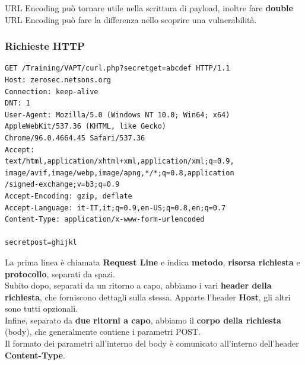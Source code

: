 \documentclass{article}
\begin{document}
URL Encoding può tornare utile nella scrittura di payload, inoltre fare \textbf{double} URL Encoding può fare la differenza nello scoprire una vulnerabilità.

\newpage
\subsubsection{Richieste HTTP}
\begin{minipage}{0.61\textwidth}
\begin{verbatim}
GET /Training/VAPT/curl.php?secretget=abcdef HTTP/1.1
Host: zerosec.netsons.org
Connection: keep-alive
DNT: 1
User-Agent: Mozilla/5.0 (Windows NT 10.0; Win64; x64) 
AppleWebKit/537.36 (KHTML, like Gecko) 
Chrome/96.0.4664.45 Safari/537.36
Accept: 
text/html,application/xhtml+xml,application/xml;q=0.9,
image/avif,image/webp,image/apng,*/*;q=0.8,application
/signed-exchange;v=b3;q=0.9
Accept-Encoding: gzip, deflate
Accept-Language: it-IT,it;q=0.9,en-US;q=0.8,en;q=0.7
Content-Type: application/x-www-form-urlencoded

secretpost=ghijkl
\end{verbatim}
\end{minipage}
\quad
\begin{minipage}{0.35\textwidth}
La prima linea è chiamata \textbf{Request Line} e indica \textbf{metodo}, \textbf{risorsa richiesta} e \textbf{protocollo}, separati da spazi.\\
Subito dopo, separati da un ritorno a capo, abbiamo i vari \textbf{header della richiesta}, che forniscono dettagli sulla stessa. Apparte l'header \textbf{Host}, gli altri sono tutti opzionali.\\
Infine, separato da \textbf{due ritorni a capo}, abbiamo il \textbf{corpo della richiesta} (body), che generalmente contiene i parametri POST.\\ Il formato dei parametri all’interno del body è comunicato all’interno dell’header \textbf{Content-Type}.
\end{minipage}
\end{document}
